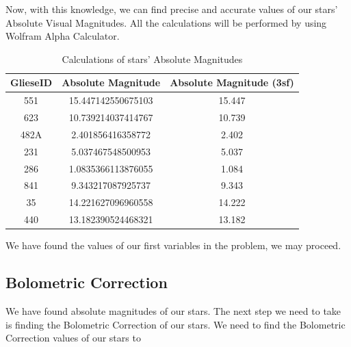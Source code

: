 \documentclass{IEEEtran}
\begin{document}
  Now, with this knowledge, we can find precise and accurate values of our stars' Absolute Visual Magnitudes. All the calculations will
 be performed by using Wolfram Alpha Calculator.
\begin{table}[h!]
    \begin{center}
      \caption{Calculations of stars' Absolute Magnitudes}
      \begin{tabular}{c | c | c}
        \textbf{GlieseID} & \textbf{Absolute Magnitude} & \textbf{Absolute Magnitude (3sf)}\\
        \hline
        551 & 15.447142550675103 & 15.447\\
        623 & 10.739214037414767 & 10.739\\
        482A & 2.401856416358772 & 2.402\\
        231 & 5.037467548500953 & 5.037\\
        286 & 1.0835366113876055 & 1.084\\
        841 & 9.343217087925737 & 9.343\\
        35& 14.221627096960558 & 14.222\\
        440 & 13.182390524468321 & 13.182\\
        
      \end{tabular}
      \label{avm}
    \end{center}
  \end{table}
  
We have found the values of our first variables in the problem, we may proceed.

\subsection{Bolometric Correction}

We have found absolute magnitudes of our stars. The next step we need to take is finding the Bolometric Correction of our stars.
We need to find the Bolometric Correction values of our stars to 











    
  
  \normalsize


  
\end{document}
